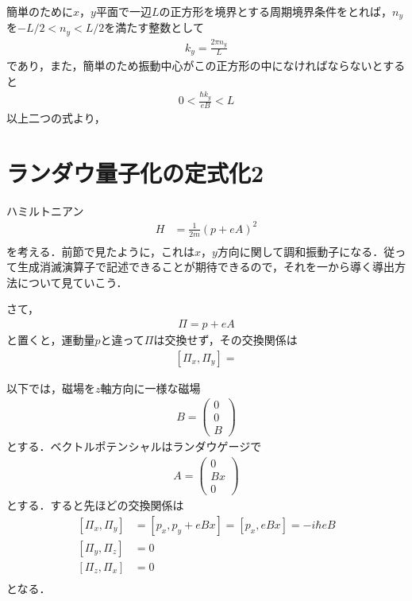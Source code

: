 \documentclass[a4j]{jarticle}
\begin{document}
簡単のために$x$，$y$平面で一辺$L$の正方形を境界とする周期境界条件をとれば，$n_y$を$-L/2<n_y<L/2$を満たす整数として
\begin{align*}
 k_y=\frac{2\pi n_y}{L}
\end{align*}
であり，また，簡単のため振動中心がこの正方形の中になければならないとすると
\begin{align*}
 0<\frac{\hbar k_y}{eB} < L
\end{align*}
以上二つの式より，


\section{ランダウ量子化の定式化2}
ハミルトニアン
\begin{align*}
 H&=\frac{1}{2m}\left(p+eA\right)^2 \\
\end{align*}
を考える．前節で見たように，これは$x$，$y$方向に関して調和振動子になる．従って生成消滅演算子で記述できることが期待できるので，それを一から導く導出方法について見ていこう．

さて，
\begin{align*}
 \Pi=p+eA
\end{align*}
と置くと，運動量$p$と違って$\Pi$は交換せず，その交換関係は
\begin{align*}
 \left[\Pi_x,\Pi_y\right]=
\end{align*}


以下では，磁場を$z$軸方向に一様な磁場
\begin{align*}
 B=\begin{pmatrix}
    0 \\
    0 \\ 
    B
   \end{pmatrix}
\end{align*}
とする．ベクトルポテンシャルはランダウゲージで
\begin{align*}
 A=\begin{pmatrix}
    0 \\
    Bx\\
    0
   \end{pmatrix}
\end{align*}
とする．すると先ほどの交換関係は
\begin{align*}
 \left[\Pi_x,\Pi_y\right]&=\left[p_x,p_y+eBx\right]=\left[p_x,eBx\right]=-i\hbar eB       \\
 \left[\Pi_y,\Pi_z\right]&=0  \\
 \left[\Pi_z,\Pi_x\right]&=0  \\
\end{align*}
となる．
\end{document}
